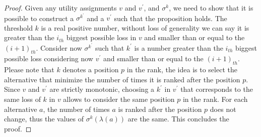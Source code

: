 \documentclass[version=3.21, pagesize, notitlepage, twoside=off, bibliography=totoc, DIV=calc, fontsize=12pt, a4paper]{scrartcl}
\begin{document}
\begin{proof}
Given any utility assignments $v$ and $v^{\prime}$, and $\sigma^k$, we need to show that it is possible to construct a $\sigma^{k^\prime}$ and a $v^\prime$ such that the proposition holds. The threshold $k$ is a real positive number, without loss of generality we can say it is greater than the $i_{th}$ biggest possible loss in $v$ and smaller than or equal to the $(i+1)_{th}$. Consider now $\sigma^{k^\prime}$ such that $k^\prime$ is a number greater than the $i_{th}$ biggest possible loss considering now $v^\prime$ and smaller than or equal to the $(i+1)_{th}$. Please note that $k$ denotes a position $p$ in the rank, the idea is to select the alternative that minimize the number of times it is ranked after the position $p$. Since $v$ and $v^{\prime}$ are strictly monotonic, choosing a $k^\prime$ in $v^\prime$ that corresponds to the same loss of $k$ in $v$ allows to consider the same position $p$ in the rank. For each alternative $a$, the number of times $a$ is ranked after the position $p$ does not change, thus the values of $\sigma^k (\lambda(a))$ are the same. This concludes the proof.  
\end{proof}
\end{document}
